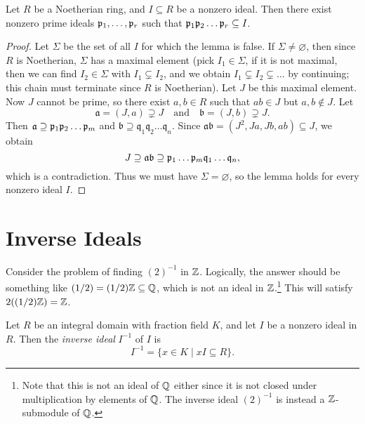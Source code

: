 \begin{lemma}
  Let $R$ be a Noetherian ring, and $I \subseteq R$
  be a nonzero ideal. Then there exist
  nonzero prime ideals $\mathfrak{p}_1, \dots, \mathfrak{p}_r$ such that
  $\mathfrak{p}_1 \mathfrak{p}_2 \dots \mathfrak{p}_r \subseteq I$.
\end{lemma}

\begin{proof}
  Let $\Sigma$ be the set of all $I$ for which
  the lemma is false. If $\Sigma \ne \varnothing$, then
  since $R$ is Noetherian, $\Sigma$ has a maximal
  element (pick $I_1 \in \Sigma$, if it is not maximal,
  then we can find $I_2 \in \Sigma$ with
  $I_1 \subsetneq I_2$, and we obtain
  $I_1 \subsetneq I_2 \subsetneq \dots$ by continuing;
  this chain must terminate since $R$ is Noetherian).
  Let $J$ be this maximal element. Now $J$ cannot
  be prime, so there exist $a, b \in R$ such that
  $ab \in J$ but $a, b \notin J$. Let
  \[
    \mathfrak{a} = (J, a) \supsetneq J \quad
    \text{and} \quad \mathfrak{b} = (J, b) \supsetneq J.
  \]
  Then $\mathfrak{a} \supseteq \mathfrak{p}_1 \mathfrak{p}_2 \dots \mathfrak{p}_m$
  and $\mathfrak{b} \supseteq \mathfrak{q}_1 \mathfrak{q}_2 \dots \mathfrak{q}_n$.
  Since $\mathfrak{a} \mathfrak{b} = (J^2, Ja, Jb, ab) \subseteq J$, we obtain
  \[
    J \supseteq \mathfrak{a} \mathfrak{b} \supseteq \mathfrak{p}_1 \dots \mathfrak{p}_m \mathfrak{q}_1 \dots \mathfrak{q}_n,
  \]
  which is a contradiction. Thus we must have
  $\Sigma = \varnothing$, so the lemma holds for
  every nonzero ideal $I$.
\end{proof}

\section{Inverse Ideals}

\begin{example}
  Consider the problem of finding $(2)^{-1}$ in $\mathbb{Z}$.
  Logically, the answer should be something like $(1 / 2) = (1 / 2) \mathbb{Z} \subseteq \mathbb{Q}$,
  which is not an ideal in $\mathbb{Z}$.\footnote{Note that this is not an ideal of $\mathbb{Q}$ either since it is not closed under multiplication by elements of $\mathbb{Q}$. The inverse ideal $(2)^{-1}$ is instead a $\mathbb{Z}$-submodule of $\mathbb{Q}$.}
  This will satisfy $2 ((1 / 2)\mathbb{Z}) = \mathbb{Z}$.
\end{example}

\begin{definition}
  Let $R$ be an integral domain with fraction field $K$,
  and let $I$ be a nonzero ideal in $R$. Then
  the \emph{inverse ideal} $I^{-1}$ of $I$ is
  \[
    I^{-1} = \{x \in K \mid xI \subseteq R\}.
  \]
\end{definition}

